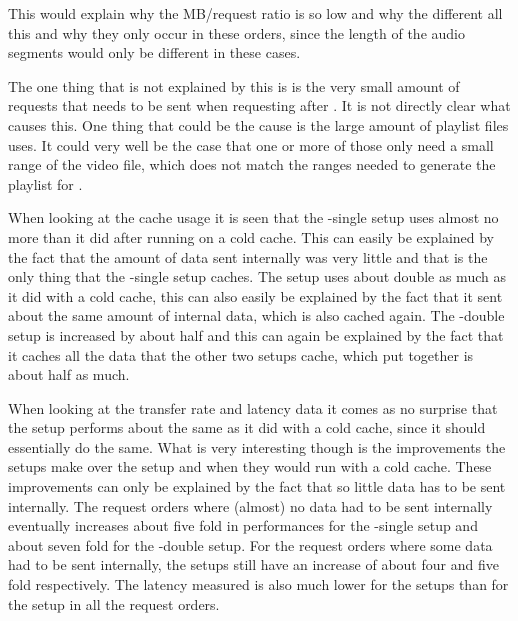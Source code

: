 \documentclass[twoside,openright]{uva-bachelor-thesis}
\begin{document}
This
would explain why the MB/request ratio is so low and why the different all this
and why they only occur in these orders, since the length of the audio segments
would only be different in these cases.

The one thing that is not explained by this is is the very small amount of
requests that needs to be sent when requesting \hls after \hds. It is not
directly clear what causes this. One thing that could be the cause is the large
amount of playlist files \hls uses. It could very well be the case that one or
more of those only need a small range of the video file, which does not match
the ranges needed to generate the playlist for \hds.

When looking at the cache usage it is seen that the \lt-single setup uses almost
no more than it did after running on a cold cache. This can easily be explained
by the fact that the amount of data sent internally was very little and that is
the only thing that the \lt-single setup caches. The \cdn setup uses about
double as much as it did with a cold cache, this can also easily be explained by
the fact that it sent about the same amount of internal data, which is also
cached again. The \lt-double setup is increased by about half and this can again
be explained by the fact that it caches all the data that the other two setups
cache, which put together is about half as much.

When looking at the transfer rate and latency data it comes as no surprise that
the \cdn setup performs about the same as it did with a cold cache, since it
should essentially do the same. What is very interesting though is the
improvements the \lt setups make over the \cdn setup and when they would run
with a cold cache. These improvements can only be explained by the fact that so
little data has to be sent internally. The request orders where (almost) no data
had to be sent internally eventually increases about five fold in performances
for the \lt-single setup and about seven fold for the \lt-double setup. For the
request orders where some data had to be sent internally, the setups still have
an increase of about four and five fold respectively. The latency measured is
also much lower for the \lt setups than for the \cdn setup in all the request
orders.
\end{document}
